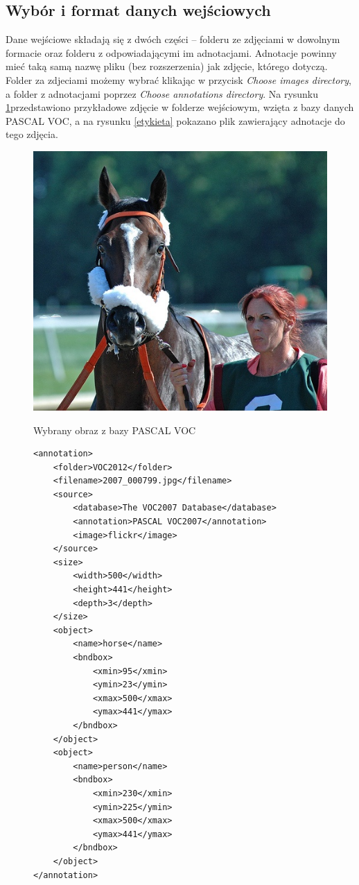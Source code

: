 \documentclass[a4paper,twoside,12pt]{book}
\begin{document}
{\subsection{Wybór i format danych wejściowych}
{Dane wejściowe składają się z dwóch części – folderu ze zdjęciami w dowolnym formacie oraz folderu z odpowiadającymi im adnotacjami. Adnotacje powinny mieć taką samą nazwę pliku (bez rozszerzenia) jak zdjęcie, którego dotyczą. Folder za zdjeciami możemy wybrać klikając w przycisk \emph{Choose images directory}, a folder z adnotacjami poprzez \emph{Choose annotations directory}. 
Na rysunku \ref{example}przedstawiono przykładowe zdjęcie w folderze wejściowym, wzięta z bazy danych PASCAL VOC, a na rysunku \ref{etykieta} pokazano plik zawierający adnotacje do tego zdjęcia.}

\begin{figure}[h!]
\caption{Wybrany obraz z bazy PASCAL VOC}

\centering
\includegraphics[scale=0.2]{2007_000799.jpg}
\label{example}
\end{figure}

\begin{figure}
\centering
\begin{lstlisting}
<annotation>
	<folder>VOC2012</folder>
	<filename>2007_000799.jpg</filename>
	<source>
		<database>The VOC2007 Database</database>
		<annotation>PASCAL VOC2007</annotation>
		<image>flickr</image>
	</source>
	<size>
		<width>500</width>
		<height>441</height>
		<depth>3</depth>
	</size>
	<object>
		<name>horse</name>
		<bndbox>
			<xmin>95</xmin>
			<ymin>23</ymin>
			<xmax>500</xmax>
			<ymax>441</ymax>
		</bndbox>
	</object>
	<object>
		<name>person</name>
		<bndbox>
			<xmin>230</xmin>
			<ymin>225</ymin>
			<xmax>500</xmax>
			<ymax>441</ymax>
		</bndbox>
	</object>
</annotation>


\end{lstlisting}
\end{figure}}
\end{document}
